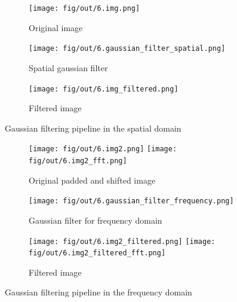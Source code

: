 \documentclass[tikz,14pt,fleqn]{article}
\begin{document}
\begin{figure}[h!]
    \centering
    \begin{subfigure}{0.23\textwidth}
        \centering
        \texttt{[image: fig/out/6.img.png]}
        \caption{Original image}
    \end{subfigure}
    \begin{subfigure}{0.23\textwidth}
        \centering
        \texttt{[image: fig/out/6.gaussian\_filter\_spatial.png]}
        \caption{Spatial gaussian filter}
    \end{subfigure}
    \begin{subfigure}{0.23\textwidth}
        \centering
        \texttt{[image: fig/out/6.img\_filtered.png]}
        \caption{Filtered image}
    \end{subfigure}
    \caption{Gaussian filtering pipeline in the spatial domain}
    \label{fig:ex6-spatial}
\end{figure}
\begin{figure}[h!]
    \centering
    \begin{subfigure}{0.32\textwidth}
        \centering
        \texttt{[image: fig/out/6.img2.png]}
        \texttt{[image: fig/out/6.img2\_fft.png]}
        \caption{Original padded and shifted image}
    \end{subfigure}
    \begin{subfigure}{0.32\textwidth}
        \centering
        \texttt{[image: fig/out/6.gaussian\_filter\_frequency.png]}
        \caption{Gaussian filter for frequency domain}
    \end{subfigure}
    \begin{subfigure}{0.32\textwidth}
        \centering
        \texttt{[image: fig/out/6.img2\_filtered.png]}
        \texttt{[image: fig/out/6.img2\_filtered\_fft.png]}
        \caption{Filtered image}
    \end{subfigure}
    \caption{Gaussian filtering pipeline in the frequency domain}
    \label{fig:ex6-frequency}
\end{figure}
\end{document}
